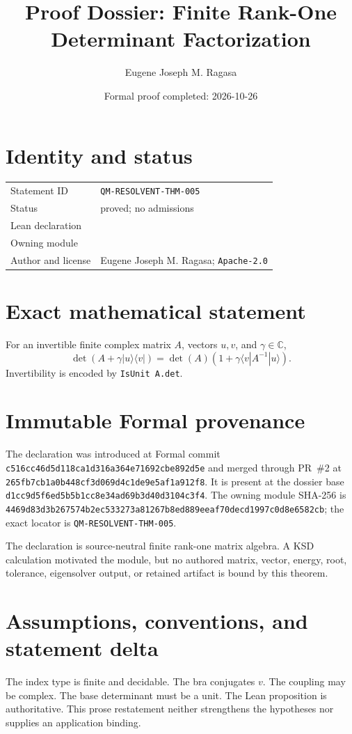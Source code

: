 \documentclass[11pt]{article}
\title{Proof Dossier: Finite Rank-One Determinant Factorization}
\author{Eugene Joseph M. Ragasa}
\date{Formal proof completed: 2026-10-26}
\begin{document}
\raggedright
\maketitle

\section{Identity and status}
\begin{tabularx}{\textwidth}{@{}lY@{}}
\toprule
Statement ID & \texttt{QM-RESOLVENT-THM-005} \\
Status & proved; no admissions \\
Lean declaration &  \\
Owning module &  \\
Author and license & Eugene Joseph M. Ragasa; \texttt{Apache-2.0} \\
\bottomrule
\end{tabularx}

\section{Exact mathematical statement}
For an invertible finite complex matrix $A$, vectors $u,v$, and $\gamma\in\mathbb C$,
\[
 \det\!\left(A+\gamma |u\rangle\langle v|\right)
 =\det(A)\left(1+\gamma\langle v|A^{-1}|u\rangle\right).
\]
Invertibility is encoded by \texttt{IsUnit A.det}.

\section{Immutable Formal provenance}
The declaration was introduced at Formal commit
\texttt{c516cc46d5d118ca1d316a364e71692cbe892d5e} and merged through PR~\#2 at
\texttt{265fb7cb1a0b448cf3d069d4c1de9e5af1a912f8}.  It is present at the dossier base
\texttt{d1cc9d5f6ed5b5b1cc8e34ad69b3d40d3104c3f4}.  The owning module SHA-256 is
\texttt{4469d83d3b267574b2ec533273a81267b8ed889eeaf70decd1997c0d8e6582cb}; the exact locator is \texttt{QM-RESOLVENT-THM-005}.

The declaration is source-neutral finite rank-one matrix algebra.  A KSD calculation motivated the module, but no authored matrix, vector, energy, root, tolerance, eigensolver output, or retained artifact is bound by this theorem.

\section{Assumptions, conventions, and statement delta}
The index type is finite and decidable.  The bra conjugates $v$.  The coupling may be complex.  The base determinant must be a unit.
The Lean proposition is authoritative.  This prose restatement neither strengthens the hypotheses
nor supplies an application binding.
\end{document}
